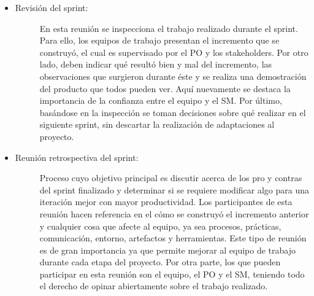\begin{itemize}
    \item   \begin{description}
                \item[Revisión del sprint: ] En esta reunión se inspecciona el trabajo realizado durante el sprint. Para ello, los equipos de trabajo presentan el incremento que se construyó, el cual es supervisado por el PO y los stakeholders. Por otro lado, deben indicar qué resultó bien y mal del incremento, las observaciones que surgieron durante éste y se realiza una demostración del producto que todos pueden ver. Aquí nuevamente se destaca la importancia de la confianza entre el equipo y el SM. Por último, basándose en la inspección se toman decisiones sobre qué realizar en el siguiente sprint, sin descartar la realización de adaptaciones al proyecto. 
        
            \end{description}

    \item   \begin{description}
                \item[Reunión retrospectiva del sprint: ] Proceso cuyo objetivo principal es discutir acerca de los pro y contras del sprint finalizado y determinar si se requiere modificar algo para una iteración mejor con mayor productividad. Los participantes de esta reunión hacen referencia en el cómo se construyó el incremento anterior y cualquier cosa que afecte al equipo, ya sea procesos, prácticas, comunicación, entorno, artefactos y herramientas. Este tipo de reunión es de gran importancia ya que permite mejorar al equipo de trabajo durante cada etapa del proyecto. Por otra parte, los que pueden participar en esta reunión son el equipo, el PO y el SM, teniendo todo el derecho de opinar abiertamente sobre el trabajo realizado.

            \end{description}
\end{itemize}

